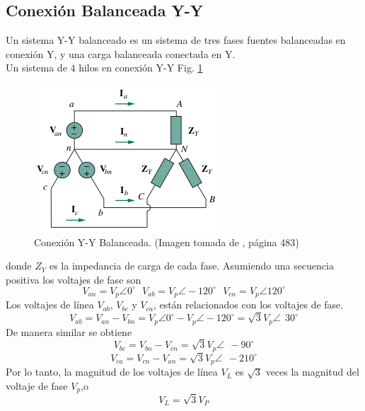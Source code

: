 \documentclass[twocolumn]{IEEEtran}
\begin{document}
\subsection{Conexión Balanceada Y-Y}
Un sistema Y-Y balanceado es un sistema de tres fases fuentes balanceadas en conexión Y, y una carga balanceada conectada en Y.\\
Un sistema de $4$ hilos en conexión Y-Y Fig. \ref{fig7}
\begin{figure}[H]
	\centering
		\includegraphics[scale=0.75]{yybalanceado.png}
	\caption{Conexión Y-Y Balanceada. (Imagen tomada de \cite{sadiku}, página 483)}
	\label{fig7}
\end{figure}
\noindent
donde $Z_Y$ es la impedancia de carga de cada fase. Asumiendo una secuencia positiva los voltajes de fase son
\begin{equation}
 V_{an} = V_{p} \angle 0 ^ {\circ}\ \ \ V_{ab} = V_{p} \angle -120 ^ {\circ}\ \ \ V_{cn} = V_{p} \angle 120 ^ {\circ}
\label{ecu8}
\end{equation}
\noindent
Los voltajes de línea $V_{ab}$, $V_{bc}$ y $V_{ca}$, están relacionados con los voltajes de fase.
\begin{equation}
 V_{ab} = V_{an} - V_{bn} = V_{p} \angle 0^{\circ} -V_{p} \angle -120^{\circ} = \sqrt{3}V_{p} \angle\ \ 30^{\circ}
\label{ecu9}
\end{equation}
\noindent
De manera similar se obtiene
\begin{equation}
 V_{bc} = V_{bn} - V_{cn} = \sqrt{3}V_{p} \angle\ \ -90^{\circ}
\label{ecu10}
\end{equation}
\begin{equation}
 V_{ca} = V_{cn} - V_{an} = \sqrt{3}V_{p} \angle\ \ -210^{\circ}
\label{ecu11}
\end{equation}
\noindent
Por lo tanto, la magnitud de los voltajes de línea $V_L$ es $\sqrt{3}$ veces la magnitud del voltaje de fase $V_p$, ​​o
\begin{equation}
 V_L = \sqrt{3} V_{P}
\label{ecu12}
\end{equation}
\end{document}
